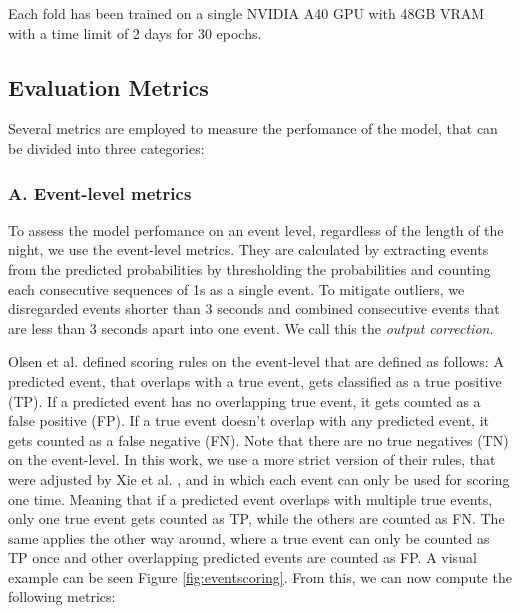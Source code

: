 Each fold has been trained on a single NVIDIA A40 GPU with 48GB VRAM with a time limit of 2 days for 30 epochs.

\subsection*{Evaluation Metrics}

Several metrics are employed to measure the perfomance of the model, that can be divided into three categories:

\subsubsection*{A. Event-level metrics}

To assess the model perfomance on an event level, regardless of the length of the night, we use the event-level metrics. They are calculated by extracting events from the predicted probabilities by thresholding the probabilities and counting each consecutive sequences of 1s as a single event. To mitigate outliers, we disregarded events shorter than 3 seconds and combined consecutive events that are less than 3 seconds apart into one event. We call this the \textit{output correction}.

Olsen et al. \cite{olsen2020robust} defined scoring rules on the event-level that are defined as follows: A predicted event, that overlaps with a true event, gets classified as a true positive (TP). If a predicted event has no overlapping true event, it gets counted as a false positive (FP). If a true event doesn't overlap with any predicted event, it gets counted as a false negative (FN). Note that there are no true negatives (TN) on the event-level. In this work, we use a more strict version of their rules, that were adjusted by Xie et al. \cite{xie2023use}, and in which each event can only be used for scoring one time. Meaning that if a predicted event overlaps with multiple true events, only one true event gets counted as TP, while the others are counted as FN. The same applies the other way around, where a true event can only be counted as TP once and other overlapping predicted events are counted as FP. A visual example can be seen Figure \ref{fig:eventscoring}. From this, we can now compute the following metrics:

